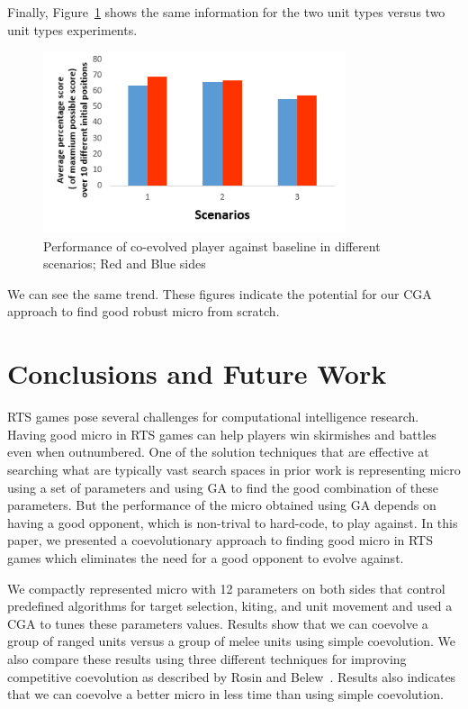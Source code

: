 \documentclass[conference,10pt]{IEEEtran}
\begin{document}
Finally, Figure~\ref{barTwoVTwo} shows the same information for the two unit types versus two unit types experiments. 
\begin{figure}
    \centerline{
      \includegraphics[width=3.5in]{VZvsVZ.png}
      }
    \caption{Performance of co-evolved player against baseline in different scenarios; Red and Blue sides}
    \label{barTwoVTwo}
\end{figure}
We can see the same trend. These figures indicate the potential for our CGA approach to find good robust micro from scratch. 
%
\section{Conclusions and Future Work}
\label{SectionConclusion}


RTS games pose several challenges for computational intelligence research. Having good micro in RTS games can help players win skirmishes and battles even when outnumbered. One of the solution techniques that are effective at searching what are typically vast search spaces in prior work is representing micro using a set of parameters and using GA to find the good combination of these parameters. But the performance of the micro obtained using GA depends on having a good opponent, which is non-trival to hard-code, to play against. In this paper, we presented a coevolutionary approach to finding good micro in RTS games which eliminates the need for a good opponent to evolve against.

We compactly represented micro with 12 parameters on both sides
that control predefined algorithms for target selection, kiting, and unit
movement and used a CGA to tunes these parameters
values. Results show that we can coevolve a group of ranged units versus a group of melee
units using simple coevolution. We also compare these results using
three different techniques for improving competitive coevolution as
described by Rosin and Belew~\cite{NMFCC97}. Results also indicates
that we can coevolve a better micro in less time than using simple
coevolution.
\end{document}
